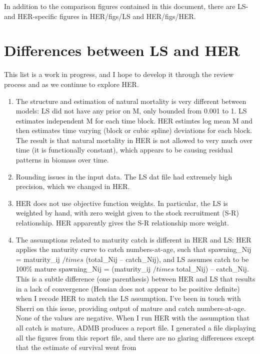 \documentclass[]{article}
\begin{document}
In addition to the comparison figures contained in this document, there
are LS- and HER-specific figures in HER/figs/LS and HER/figs/HER.

\section{Differences between LS and
HER}\label{differences-between-ls-and-her}

This list is a work in progress, and I hope to develop it through the
review process and as we continue to explore HER.

\begin{enumerate}
\def\labelenumi{\arabic{enumi}.}
\item
  The structure and estimation of natural mortality is very different
  between models: LS did not have any prior on M, only bounded from
  0.001 to 1. LS estimates independent M for each time block. HER
  estimtes log mean M and then estimates time varying (block or cubic
  spline) deviations for each block. The result is that natural
  mortality in HER is not allowed to very much over time (it is
  functionally constant), which appears to be causing residual patterns
  in biomass over time.
\item
  Rounding issues in the input data. The LS dat file had extremely high
  precision, which we changed in HER.
\item
  HER does not use objective function weights. In particular, the LS is
  weighted by hand, with zero weight given to the stock recruitment
  (S-R) relationship. HER apparently gives the S-R relationship more
  weight.
\item
  The assumptions related to maturity catch is different in HER and LS:
  HER applies the maturity curve to catch numbers-at-age, such that
  spawning\_Nij = maturity\_ij \(/times\) (total\_Nij -- catch\_Nij),
  and LS assumes catch to be 100\% mature spawning\_Nij = (maturity\_ij
  \(/times\) total\_Nij) -- catch\_Nij. This is a subtle difference (one
  parenthesis) between HER and LS that results in a lack of convergence
  (Hessian does not appear to be positive definite) when I recode HER to
  match the LS assumption. I've been in touch with Sherri on this issue,
  providing output of mature and catch numbers-at-age. None of the
  values are negative. When I run HER with the assumption that all catch
  is mature, ADMB produces a report file. I generated a file displaying
  all the figures from this report file, and there are no glaring
  differences except that the estimate of survival went from

\end{enumerate}
\end{document}
